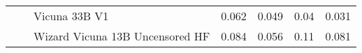\begin{table}[ht]
\begin{tabular}{l|l|l|rrrr}
 &  & Vicuna 33B V1 & {\cellcolor[HTML]{FEE1D4}} \color[HTML]{000000} 0.062 & {\cellcolor[HTML]{FEE9DF}} \color[HTML]{000000} 0.049 & {\cellcolor[HTML]{FFF0E8}} \color[HTML]{000000} 0.04 & {\cellcolor[HTML]{FFF5F0}} \color[HTML]{000000} 0.031 \\
 &  & Wizard Vicuna 13B Uncensored HF & {\cellcolor[HTML]{FDC9B3}} \color[HTML]{000000} 0.084 & {\cellcolor[HTML]{FEE5D8}} \color[HTML]{000000} 0.056 & {\cellcolor[HTML]{FCAA8D}} \color[HTML]{000000} 0.11 & {\cellcolor[HTML]{FDCBB6}} \color[HTML]{000000} 0.081 \\
\bottomrule
\end{tabular}
            
\end{table}
